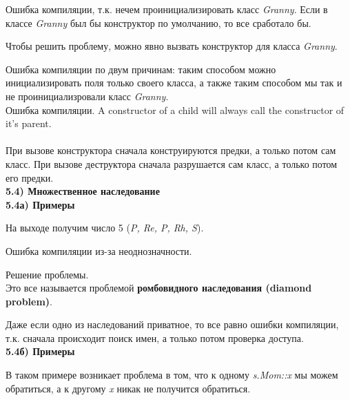 \documentclass{article}
\begin{document}
Ошибка компиляции, т.к. нечем проинициализировать класс \textit{Granny}. Если в классе \textit{Granny} был бы конструктор по умолчанию, то все сработало бы. 

Чтобы решить проблему, можно явно вызвать конструктор для класса \textit{Granny}.
	
Ошибка компиляции по двум причинам: таким способом можно инициализировать поля только своего класса, а также таким способом мы так и не проинициализровали класс \textit{Granny}. \\

Ошибка компиляции. A constructor of a child will always call the constructor of it's parent.\\\\
При вызове конструктора сначала конструируются предки, а только потом сам класс. При вызове деструктора сначала разрушается сам класс, а только потом его предки.\\
\noindent \textbf{5.4) Множественное наследование}\\
\noindent \textbf{5.4а) Примеры}

На выходе получим число 5 (\textit{P, Re, P, Rh, S}).

Ошибка компиляции из-за неоднозначности.

Решение проблемы.\\
Это все называется проблемой \textbf{ромбовидного наследования (diamond problem)}.

Даже если одно из наследований приватное, то все равно ошибки компиляции, т.к. сначала происходит поиск имен, а только потом проверка доступа.\\
\noindent \textbf{5.4б) Примеры}

В таком примере возникает проблема в том, что к одному \textit{s.Mom::x} мы можем обратиться, а к другому \textit{x} никак не получится обратиться.\\
\end{document}
